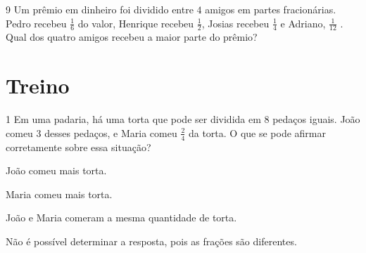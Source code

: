 
\num{9} Um prêmio em dinheiro foi dividido entre $4$ amigos em partes
fracionárias. Pedro recebeu $\frac{1}{6}$ do valor, Henrique recebeu $\frac{1}{2}$, Josias
recebeu $\frac{1}{4}$ e Adriano, $\frac{1}{12}$ . Qual dos quatro amigos recebeu a maior
parte do prêmio?









\section*{Treino}

\num{1}  Em uma padaria, há uma torta que pode ser dividida em $8$ pedaços
iguais. João comeu $3$ desses pedaços, e Maria comeu $\frac{2}{4}$ da torta.
O que se pode afirmar corretamente sobre essa situação?

\begin{escolha}
\item João comeu mais torta.
\item Maria comeu mais torta.
\item João e Maria comeram a mesma quantidade de torta.
\item Não é possível determinar a resposta, pois as frações são diferentes.
\end{escolha}




